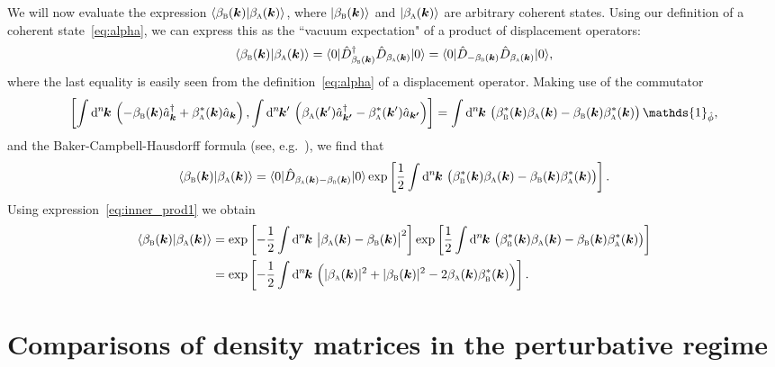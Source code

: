 \documentclass[pra,nofootinbib,floats,aps,twocolumn,tightenlines,superscriptaddress]{revtex4-1}
\renewcommand*\d[2][]{%
	\mathrm{d}%
	\ifx\relax#1\relax\else
	\rule{-0.02em}{1.5ex}^{#1}\rule{0.08em}{0ex}\!
	\fi
	#2\,
}
\newcommand{\ket}[1]{| {#1} \rangle}
\newcommand{\bra}[1]{\langle {#1} |}
\renewcommand{\a}[1]{\hat{a}_{\bm{#1}}}
\newcommand{\ad}[1]{\hat{a}_{\bm{#1}}^\dagger}
\newcommand{\ba}{\beta_\textsc{a}(\bm k)}
\newcommand{\bb}{\beta_\textsc{b}(\bm k)}
\begin{document}
We will now evaluate the expression $\langle\bb\ket{\ba}$, where $\ket{\bb}$ and $\ket{\ba}$ are arbitrary coherent states. Using our definition of a coherent state~\eqref{eq:alpha}, we can express this as the ``vacuum expectation" of a product of displacement operators:
\begin{equation}
    \langle\bb\ket{\ba}
    =
    \bra{0}
    \hat{D}_{\bb}^\dagger
    \hat{D}_{\ba}
    \ket{0}
    =
    \bra{0}
    \hat{D}_{-\bb}
    \hat{D}_{\ba}
    \ket{0},
\end{equation}
where the last equality is easily seen from the definition~\eqref{eq:alpha} of a displacement operator. Making use of the commutator
\begin{align}
    \left[
    \int\d[n]{\bm{k}}
    \left(-\bb\ad{k}+
    \beta_\textsc{a}^*(\bm{k})
    \a{k}\right),
    \int\d[n]{\bm{k}'}
    \left(\beta_\textsc{a}(\bm{k}')\ad{k'}-
    \beta_\textsc{a}^*(\bm{k}')\a{k'}\right)
    \right]
    =
    \int\d[n]{\bm k}
    \left(
     \beta_\textsc{b}^*(\bm{k})\ba-
    \bb \beta_\textsc{a}^*(\bm{k})
    \right)\mathds{1}_{\hat{\phi}},
\end{align}
and the Baker-Campbell-Hausdorff formula (see, e.g.~\cite{Truax1988}), we find that
\begin{equation}
    \langle\bb\ket{\ba}
    =
    \bra{0}
    \hat{D}_{\ba-\bb}
    \ket{0}
    \exp 
    \left[
    \frac{1}{2}
    \int\d[n]{\bm k}
    \left(
    \beta_\textsc{b}^*(\bm{k})\ba-
    \bb \beta_\textsc{a}^*(\bm{k})
    \right)
    \right].
\end{equation}
Using expression~\eqref{eq:inner_prod1} we obtain
\begin{align}
    \langle\bb\ket{\ba}
    &=
    \exp 
    \left[
    -\frac{1}{2}
    \int\d[n]{\bm k}
    \left|
    \ba-\bb
    \right|^2
    \right]
    \exp 
    \left[
    \frac{1}{2}
    \int\d[n]{\bm k}
    \left(
    \beta_\textsc{b}^*(\bm{k})\ba-
    \bb \beta_\textsc{a}^*(\bm{k})
    \right)
    \right]
    \notag\\
    &=
    \exp 
    \left[
    -\frac{1}{2}
    \int\d[n]{\bm k}
    \left(
    |\ba|^2+
    |\bb|^2-
    2 \ba\beta_\textsc{b}^*(\bm k)
    \right)
    \right].
\end{align}




\section{Comparisons of density matrices in the perturbative regime}
\label{Appendix:pert}
\end{document}
